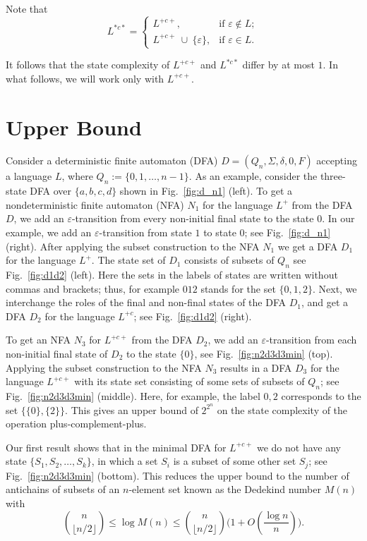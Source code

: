 \documentclass[runningheads]{llncs}
\newcommand{\eps}{\varepsilon}
\renewcommand{\epsilon}{\varepsilon}
\begin{document}
Note that
\begin{displaymath}
L^{*c*} = \begin{cases}
		L^{+c+},& \text{if $\epsilon \not\in L$}; \\
		L^{+c+} \ \cup \ \lbrace \epsilon \rbrace,  &
			\text{if $\epsilon \in L$}.
	\end{cases}
\end{displaymath}

It follows that the state complexity of $L^{+c+}$ and
$L^{*c*}$ differ by at most $1$.  In what follows, we will work
only with $L^{+c+}$.

\section{Upper Bound}
\label{***upper}

Consider a deterministic finite automaton
(DFA) $D=(Q_n,\Sigma,\delta,0,F)$
accepting a language $L$, where $Q_n := \{ 0,1,\ldots, n-1 \}$.
As an example, consider the three-state DFA over $\{a,b,c,d\}$
shown in Fig.~\ref{fig:d_n1} (left).
To get a nondeterministic finite automaton
(NFA) $N_1$ for the language $L^+$ from the DFA $D$,
we add an $\eps$-transition 
from every non-initial final state to the state $0$.
In our example, we add an $\eps$-transition from state $1$ to state $0$;
see Fig.~\ref{fig:d_n1} (right).
After applying the subset construction to the NFA $N_1$
we get a DFA $D_1$ for the language $L^+$.
The state set of $D_1$ consists 
of subsets of $Q_n$
see Fig.~\ref{fig:d1d2} (left). Here the sets in the labels of states
are written without commas and brackets;
thus, for example $012$ stands for the set $\{0,1,2\}$.
Next, we interchange the roles of the
final and non-final states of the DFA $D_1$,
and get a DFA $D_2$ for the language $L^{+c}$; see Fig.~\ref{fig:d1d2} (right).



To get an NFA $N_3$ for $L^{+c+}$ from the DFA $D_2$,
we add an $\eps$-transition from each non-initial final state of $D_2$
to the state $\{0\}$, see Fig.~\ref{fig:n2d3d3min} (top).
Applying the subset construction to the NFA $N_3$
results in a DFA $D_3$ for the language $L^{+c+}$
with its state set
consisting of some sets of subsets of $Q_n$;
see Fig.~\ref{fig:n2d3d3min} (middle). Here, for example, the label $0,2$
corresponds to the set $\{\{0\},\{2\}\}$.
This gives an  upper bound of $2^{2^n}$
on the state complexity of the operation plus-complement-plus.

Our first result shows that 
in the minimal DFA for $L^{+c+}$
we do not have
any state $\{S_1,S_2,\ldots,S_k\}$,
in which a set $S_i$ is a subset of some other set $S_j$;
see Fig.~\ref{fig:n2d3d3min} (bottom).
This reduces the upper bound 
to the  number of antichains of subsets
of an $n$-element set known as the Dedekind number $M(n)$ with
\cite{KM75}
$$
   {n \choose \lfloor n/2\rfloor }\le \log M(n) 
   \le {n \choose \lfloor n/2\rfloor}\Big(1+O(\frac{\log n}{n}) \Big).
$$
\end{document}
